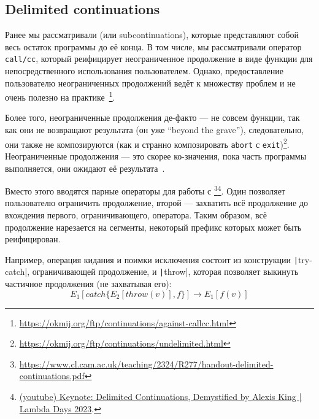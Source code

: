\cite{reynolds1972definitional}






\subsection{Delimited continuations}

Ранее мы рассматривали  (или subcontinuations), которые представляют собой весь остаток программы до её конца.
В том числе, мы рассматривали оператор \texttt{call/cc}, который реифицирует неограниченное продолжение в виде функции для непосредственного использования пользователем.
Однако, предоставление пользователю неограниченных продолжений ведёт к множеству проблем и не очень полезно на практике~\footnote{\url{https://okmij.org/ftp/continuations/against-callcc.html}}.

Более того, неограниченные продолжения де-факто --- не совсем функции, так как они не возвращают результата (он уже ``beyond the grave''), следовательно, они также не композируются (как и странно композировать \texttt{abort} с \texttt{exit})\footnote{\url{https://okmij.org/ftp/continuations/undelimited.html}}.
Неограниченные продолжения --- это скорее ко-значения, пока часть программы выполняется, они ожидают её результата~\cite{curien2000duality}.

Вместо этого вводятся парные операторы для работы с \footnote{\url{https://www.cl.cam.ac.uk/teaching/2324/R277/handout-delimited-continuations.pdf}}\footnote{\href{https://youtu.be/TE48LsgVlIU?si=cBdUCzYwYWpwPkkh}{(youtube)  Keynote: Delimited Continuations, Demystified by Alexis King | Lambda Days 2023}.}.
Один позволяет пользователю ограничить продолжение, второй --- захватить всё продолжение до вхождения первого, ограничивающего, оператора.
Таким образом, всё продолжение нарезается на сегменты, некоторый префикс которых может быть реифицирован.

Например, операция кидания и поимки исключения состоит из конструкции \texttt|try-catch|, ограничивающей продолжение, и \texttt|throw|, которая позволяет выкинуть частичное продолжения (не захватывая его):
\[
    E_1[catch\{E_2[throw(v)], f\}] \to E_1[f(v)]
\]

